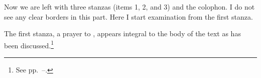 
Now we are left with three stanzas (items 1, 2, and 3) and the colophon. I do not see any clear borders in this part. Here I start examination from the first stanza.

The first stanza, a prayer to \Krsna, appears integral to the body of the text as has been discussed.\footnote{See pp.~\pageref{krsnaverse}--\pageref{patanjaliverseone}.} 

